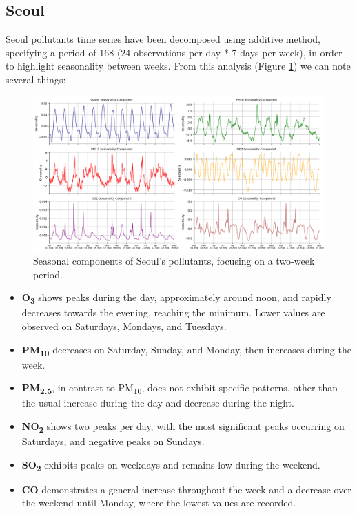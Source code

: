 \subsection{Seoul}
Seoul pollutants time series have been decomposed using additive method, specifying a period of 168 (24 observations per day * 7 days per week), in order to highlight seasonality between weeks.
From this analysis (Figure \ref{fig:seasonality_seoul}) we can note several things:

\begin{figure}[h]
    \centering
    \includegraphics[width=1\linewidth]{images/seoul_seasonality.png}
    \caption{Seasonal components of Seoul's pollutants, focusing on a two-week period.}
    \label{fig:seasonality_seoul}
\end{figure}

\begin{itemize}
    \item \textbf{O\textsubscript{3}} shows peaks during the day, approximately around noon, and rapidly decreases towards the evening, reaching the minimum. Lower values are observed on Saturdays, Mondays, and Tuesdays.
    \item \textbf{PM\textsubscript{10}} decreases on Saturday, Sunday, and Monday, then increases during the week.
    \item \textbf{PM\textsubscript{2.5}}, in contrast to PM\textsubscript{10}, does not exhibit specific patterns, other than the usual increase during the day and decrease during the night.
    \item \textbf{NO\textsubscript{2}} shows two peaks per day, with the most significant peaks occurring on Saturdays, and negative peaks on Sundays.
    \item \textbf{SO\textsubscript{2}} exhibits peaks on weekdays and remains low during the weekend.
    \item \textbf{CO} demonstrates a general increase throughout the week and a decrease over the weekend until Monday, where the lowest values are recorded.
\end{itemize}

